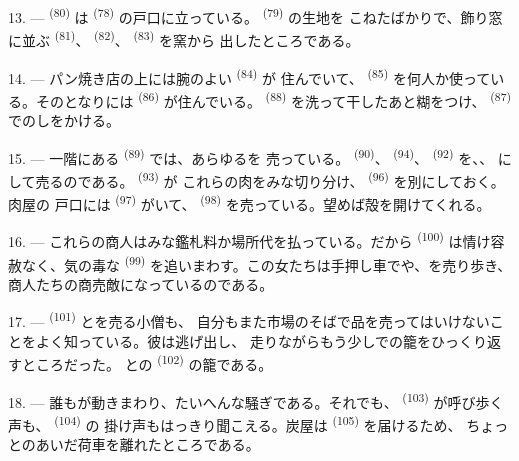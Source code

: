 13. ---  \textsuperscript{(80)} は
\textsuperscript{(78)} の戸口に立っている。 \textsuperscript{(79)} の生地を
こねたばかりで、飾り窓に並ぶ \textsuperscript{(81)}、
 \textsuperscript{(82)}、 \textsuperscript{(83)} を窯から
出したところである。

14. --- パン焼き店の上には腕のよい \textsuperscript{(84)} が
住んでいて、 \textsuperscript{(85)} を何人か使っている。そのとなりには
 \textsuperscript{(86)} が住んでいる。
\textsuperscript{(88)} を洗って干したあと糊をつけ、
\textsuperscript{(87)} でのしをかける。

\VUsaut{4.0mm}
\VUsaut{3.0mm}

15. --- 一階にある \textsuperscript{(89)} では、あらゆるを
売っている。 \textsuperscript{(90)}、 \textsuperscript{(94)}、
 \textsuperscript{(92)} を、、
にして売るのである。 \textsuperscript{(93)} が
これらの肉をみな切り分け、 \textsuperscript{(96)} を別にしておく。肉屋の
戸口には \textsuperscript{(97)} がいて、
\textsuperscript{(98)} を売っている。望めば殻を開けてくれる。

16. --- これらの商人はみな鑑札料か場所代を払っている。だから
\textsuperscript{(100)} は情け容赦なく、気の毒な
\textsuperscript{(99)} を追いまわす。この女たちは手押し車でや、を売り歩き、商人たちの商売敵になっているのである。

\VUsaut{4.0mm}
\VUsaut{3.0mm}

17. ---  \textsuperscript{(101)} とを売る小僧も、
自分もまた市場のそばで品を売ってはいけないことをよく知っている。彼は逃げ出し、
走りながらもう少しでの籠をひっくり返すところだった。
との \textsuperscript{(102)} の籠である。

18. --- 誰もが動きまわり、たいへんな騒ぎである。それでも、
\textsuperscript{(103)} が呼び歩く声も、 \textsuperscript{(104)} の
掛け声もはっきり聞こえる。炭屋は \textsuperscript{(105)} を届けるため、
ちょっとのあいだ荷車を離れたところである。
\VUsaut{6.0mm}
\VUfilet{22mm}

